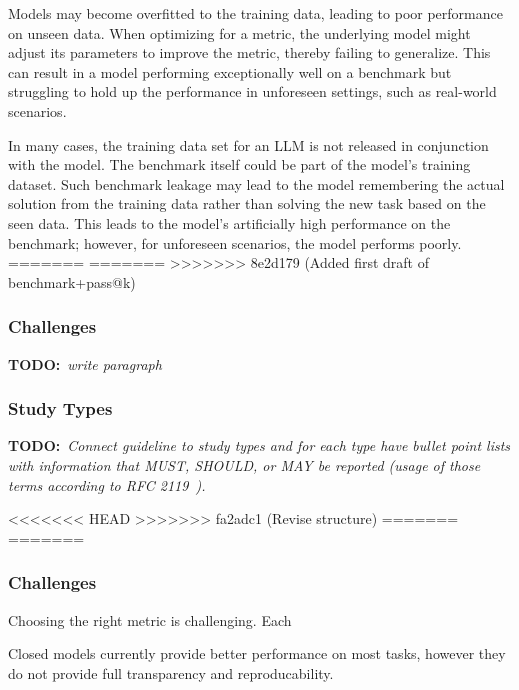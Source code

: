 \documentclass[11pt]{article}
\newcommand{\todo}[1]{{\textbf{TODO:}\ \textit{#1}}} %
\begin{document}
Models may become overfitted to the training data, leading to poor performance on unseen data.
When optimizing for a metric, the underlying model might adjust its parameters to improve the metric, thereby failing to generalize.
This can result in a model performing exceptionally well on a benchmark but struggling to hold up the performance in unforeseen settings, such as real-world scenarios.

In many cases, the training data set for an LLM is not released in conjunction with the model.
The benchmark itself could be part of the model's training dataset.
Such benchmark leakage may lead to the model remembering the actual solution from the training data rather than solving the new task based on the seen data.
This leads to the model's artificially high performance on the benchmark; however, for unforeseen scenarios, the model performs poorly.
=======
=======
>>>>>>> 8e2d179 (Added first draft of benchmark+pass@k)

\subsubsection{Challenges}

\todo{write paragraph}


\subsubsection{Study Types}

\todo{Connect guideline to study types and for each type have bullet point lists with information that MUST, SHOULD, or MAY be reported (usage of those terms according to RFC 2119~\cite{rfc2119}).}

<<<<<<< HEAD
>>>>>>> fa2adc1 (Revise structure)
=======
=======

\subsubsection{Challenges}

Choosing the right metric is challenging.
Each



Closed models currently provide better performance on most tasks, however they do not provide full transparency and reproducability.
\end{document}
